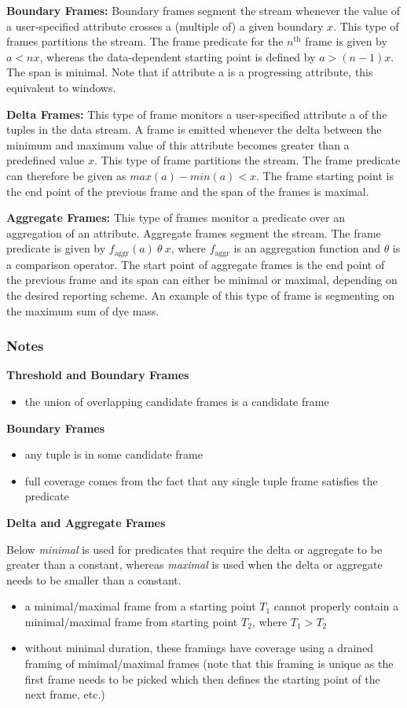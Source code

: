\documentclass{vldb}
\begin{document}
\textbf{Boundary Frames:} Boundary frames segment the stream whenever the value of a user-specified attribute crosses a (multiple of) a given boundary $x$. This type of frames partitions the stream. The frame predicate for the $n^\text{th}$ frame is given by $a < nx$, whereas the data-dependent starting point is defined by $a > (n-1)x$. The span is minimal. Note that if attribute a is a progressing attribute, this equivalent to windows.

\textbf{Delta Frames:} This type of frame monitors a user-specified attribute a of the tuples in the data stream. A frame is emitted whenever the delta between the minimum and maximum value of this attribute becomes greater than a predefined value $x$. This type of frame partitions the stream. The frame predicate can therefore be given as $max⁡(a)-min⁡(a) < x$. The frame starting point is the end point of the previous frame and the span of the frames is maximal.

\textbf{Aggregate Frames:} This type of frames monitor a predicate over an aggregation of an attribute. Aggregate frames segment the stream. The frame predicate is given by $f_\text{aggr}(a) \ \theta \ x$, where $f_\text{aggr}$ is an aggregation function and $\theta$ is a comparison operator. The start point of aggregate frames is the end point of the previous frame and its span can either be minimal or maximal, depending on the desired reporting scheme. An example of this type of frame is segmenting on the maximum sum of dye mass.

\subsubsection{Notes}

\textbf{Threshold and Boundary Frames}
\begin{itemize}
\item the union of overlapping candidate frames is a candidate frame
\end{itemize}

\textbf{Boundary Frames}
\begin{itemize}
\item any tuple is in some candidate frame
\item full coverage comes from the fact that any single tuple frame satisfies the predicate
\end{itemize}

\textbf{Delta and Aggregate Frames}

Below \emph{minimal} is used for predicates that require the delta or aggregate to be greater than a constant, whereas \emph{maximal} is used when the delta or aggregate needs to be smaller than a constant.
\begin{itemize}
\item a minimal/maximal frame from a starting point $T_1$ cannot properly contain a minimal/maximal frame from starting point $T_2$, where $T_1 > T_2$
\item without minimal duration, these framings have coverage using a drained framing of minimal/maximal frames (note that this framing is unique as the first frame needs to be picked which then defines the starting point of the next frame, etc.)
\end{itemize}
\end{document}
